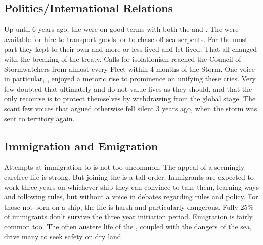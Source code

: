 \documentclass[blue]{GL2020}
\begin{document}


\subsection*{Politics/International Relations}
Up until 6 years ago, the \pShip{} were on good terms with both the \pFarm{} and \pTech{}. The \pShippies{} were available for hire to transport goods, or to chase off sea serpents. For the most part they kept to their own and more or less lived and let lived. That all changed with the breaking of the treaty. Calls for isolationism reached the Council of Stormwatchers from almost every Fleet within 4 months of the Storm. One voice in particular, \cLoud{}, enjoyed a metoric rise to prominence on unifying these cries. Very few \pShippies{} doubted that ultimately \pFarm{} and \pTech{} do not value \pShip{} lives as they should, and that the only recourse is to protect themselves by withdrawing from the global stage. The scant few voices that argued otherwise fell silent 3 years ago, when the storm was sent to \pShip{} territory again.

\subsection*{Immigration and Emigration}
Attempts at immigration to \pShip{} is not too uncommon. The appeal of a seemingly carefree life is strong. But joining the \pShippies{} is a tall order. Immigrants are expected to work three years on whichever ship they can convince to take them, learning \pShip{} ways and  following \pShip{} rules, but without a voice in debates regarding rules and policy. For those not born on a ship, the life is harsh and particularly dangerous. Fully 25\% of immigrants don't survive the three year initiation period. Emigration is fairly common too. The often austere life of the \pShip{}, coupled with the dangers of the sea, drive many to seek safety on dry land.
\end{document}
